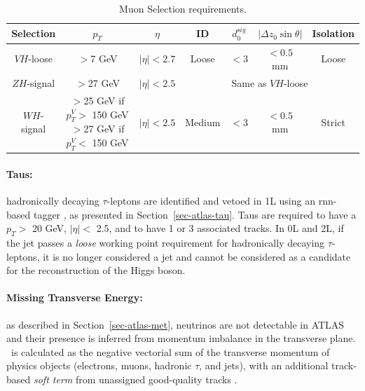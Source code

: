 \begin{table}[!htbp]
    \begin{center}
        \begin{tabular}{ccccccc} \hline \hline
          Selection & $p_T$ & $\eta$ & ID & $d_{0}^{\mathrm sig}$  & $|\Delta{z_{0}}\sin\theta|$ & Isolation \\ \hline
          $VH$-loose & $>$7 GeV & $|\eta|< 2.7$ & Loose & $ <3$ & $<0.5$ mm & Loose \\ %
          $ZH$-signal & $>$27 GeV & $|\eta| < 2.5$ & \multicolumn{4}{c}{Same as $VH$-loose} \\
          $WH$-signal & \makecell[c]{$>$25 GeV if $p_T^V>$ 150 GeV\\ $>$27 GeV if $p_T^V<$ 150 GeV} & $|\eta|< 2.5$ & Medium & $ <3$ & $<0.5$ mm & Strict \\
          \hline\hline
        \end{tabular}
      \caption{Muon Selection requirements.} 
      \label{tbl:muonOb}
    \end{center}
  \end{table}
  
\paragraph{Taus:} hadronically decaying $\tau$-leptons are identified and vetoed in 1L using an \gls{rnn}-based tagger \cite{ATL-PHYS-PUB-2019-033}, as presented in Section~\ref{sec-atlas-tau}. Taus are required to have a $p_T >$ 20 GeV, $|\eta| <$ 2.5, and to have 1 or 3 associated tracks. In 0L and 2L, if the jet passes a \textit{loose} working point requirement for hadronically decaying $\tau$-leptons, it is no longer considered a jet and cannot be considered as a candidate for the reconstruction of the Higgs boson. 

\paragraph{Missing Transverse Energy:} as described in Section~\ref{sec-atlas-met}, neutrinos are not detectable in ATLAS and their presence is inferred from momentum imbalance in the transverse plane. \etm\ is calculated as the negative vectorial sum of the transverse momentum of physics objects (electrons, muons, hadronic $\tau$, and jets), with an additional track-based \textit{soft term} from unassigned good-quality tracks \cite{ATLASmetReco}. 

